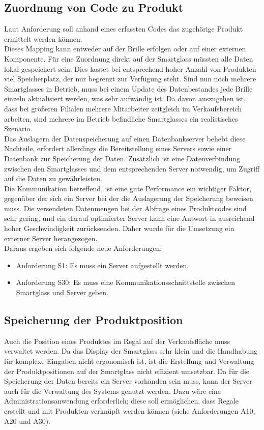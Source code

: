 \subsection{Zuordnung von Code zu Produkt}
Laut Anforderung soll anhand eines erfassten Codes das zugehörige Produkt ermittelt werden können.\\
Dieses Mapping kann entweder auf der Brille erfolgen oder auf einer externen Komponente. Für eine Zuordnung direkt auf der Smartglass müssten alle Daten lokal gespeichert sein. Dies kostet bei entsprechend hoher Anzahl von Produkten viel Speicherplatz, der nur begrenzt zur Verfügung steht. Sind nun noch mehrere Smartglasses in Betrieb, muss bei einem Update des Datenbestandes jede Brille einzeln aktualisiert werden, was sehr aufwändig ist. Da davon auszugehen ist, dass bei größeren Filialen mehrere Mitarbeiter zeitgleich im Verkaufsbereich arbeiten, sind mehrere im Betrieb befindliche Smartglasses ein realistisches Szenario.\\
Das Auslagern der Datenspeicherung auf einen Datenbankserver behebt diese Nachteile, erfordert allerdings die Bereitstellung eines Servers sowie einer Datenbank zur Speicherung der Daten. Zusätzlich ist eine Datenverbindung zwischen den Smartglasses und dem entsprechenden Server notwendig, um Zugriff auf die Daten zu gewährleisten.\\
Die Kommunikation betreffend, ist eine gute Performance ein wichtiger Faktor, gegenüber der sich ein Server bei der die Auslagerung der Speicherung beweisen muss. Die versendeten Datenmengen bei der Abfrage eines Produktcodes sind sehr gering, und ein darauf optimierter Server kann eine Antwort in ausreichend hoher Geschwindigkeit zurücksenden. Daher wurde für die Umsetzung ein externer Server herangezogen.\\

Daraus ergeben sich folgende neue Anforderungen: 
\begin{itemize}
	\item Anforderung S1: Es muss ein Server aufgestellt werden.
	\item Anforderung S30: Es muss eine Kommunikationsschnittstelle zwischen Smartglass und Server geben.
\end{itemize}

\subsection{Speicherung der Produktposition}
Auch die Position eines Produktes im Regal auf der Verkaufsfläche muss verwaltet werden. Da das Display der Smartglass sehr klein und die Handhabung für komplexe Eingaben nicht ergonomisch ist, ist die Erstellung und Verwaltung der Produktpositionen auf der Smartglass nicht effizient umsetzbar. Da für die Speicherung der Daten bereits ein Server vorhanden sein muss, kann der Server auch für die Verwaltung des Systems genutzt werden. Dazu wäre eine Administrationsanwendung erforderlich; diese soll ermöglichen, dass Regale erstellt und mit Produkten verknüpft werden können (siehe Anforderungen A10, A20 und A30).\\

